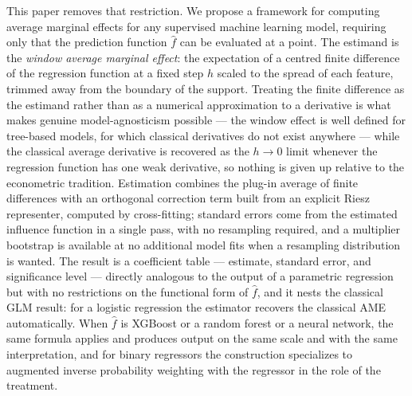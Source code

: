 \documentclass[12pt,a4paper]{article}
\numberwithin{equation}{section}
\theoremstyle{plain}
\theoremstyle{definition}
\begin{document}
	This paper removes that restriction. We propose a framework for computing average
	marginal effects for any supervised machine learning model, requiring only that the
	prediction function $\hat{f}$ can be evaluated at a point. The estimand is the
	\emph{window average marginal effect}: the expectation of a centred finite
	difference of the regression function at a fixed step $h$ scaled to the spread of
	each feature, trimmed away from the boundary of the support. Treating the finite
	difference as the estimand rather than as a numerical approximation to a
	derivative is what makes genuine model-agnosticism possible --- the window effect
	is well defined for tree-based models, for which classical derivatives do not
	exist anywhere --- while the classical average derivative is recovered as the
	$h \to 0$ limit whenever the regression function has one weak derivative, so
	nothing is given up relative to the econometric tradition. Estimation combines
	the plug-in average of finite differences with an orthogonal correction term
	built from an explicit Riesz representer, computed by cross-fitting; standard
	errors come from the estimated influence function in a single pass, with no
	resampling required, and a multiplier bootstrap is available at no additional
	model fits when a resampling distribution is wanted. The result is a coefficient
	table --- estimate, standard error, and significance level --- directly analogous
	to the output of a parametric regression but with no restrictions on the
	functional form of $\hat{f}$, and it nests the classical GLM result: for a
	logistic regression the estimator recovers the classical AME automatically.
	When $\hat{f}$ is XGBoost or a random forest or a
	neural network, the same formula applies and produces output on the same scale
	and with the same interpretation, and for binary regressors the construction
	specializes to augmented inverse probability weighting with the regressor in the
	role of the treatment.
	
\end{document}
